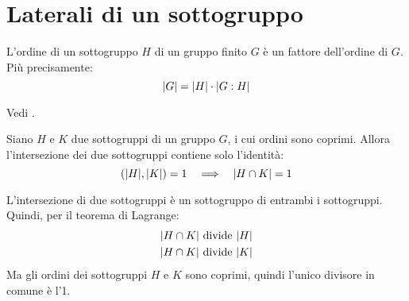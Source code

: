 \chapter{Laterali di un sottogruppo}
\label{ch:laterali_sottogruppo}

\begin{teorema}
	\label{thr:Laterali_Lagrange}
	L'ordine di un sottogruppo $H$ di un gruppo finito $G$ è un fattore dell'ordine di $G$.
	Più precisamente:
	\begin{equation*}
		\lvert G \rvert = \lvert H \rvert \cdot \lvert G:H \rvert
	\end{equation*}
\end{teorema}
\begin{dimostrazione}
	Vedi \cite[pag. 52]{jacobson}.
\end{dimostrazione}

\begin{corollario}
	\label{cor:sottogruppi_ordini_coprimi}
	Siano $H$ e $K$ due sottogruppi di un gruppo $G$, i cui ordini sono coprimi.
	Allora l'intersezione dei due sottogruppi contiene solo l'identità:
	\begin{equation*}
		 ( \lvert H \rvert , \lvert K \rvert )  = 1 \quad\Longrightarrow\quad \lvert H \cap K \rvert = 1
	\end{equation*}
\end{corollario}
\begin{dimostrazione}
	L'intersezione di due sottogruppi è un sottogruppo di entrambi i sottogruppi.
	Quindi, per il teorema di Lagrange:
	\begin{gather*}
		\lvert H \cap K \rvert \text{ divide } \lvert H \rvert \\
		\lvert H \cap K \rvert \text{ divide } \lvert K \rvert
	\end{gather*}
	Ma gli ordini dei sottogruppi $H$ e $K$ sono coprimi, quindi l'unico divisore in comune è l'1.
\end{dimostrazione}